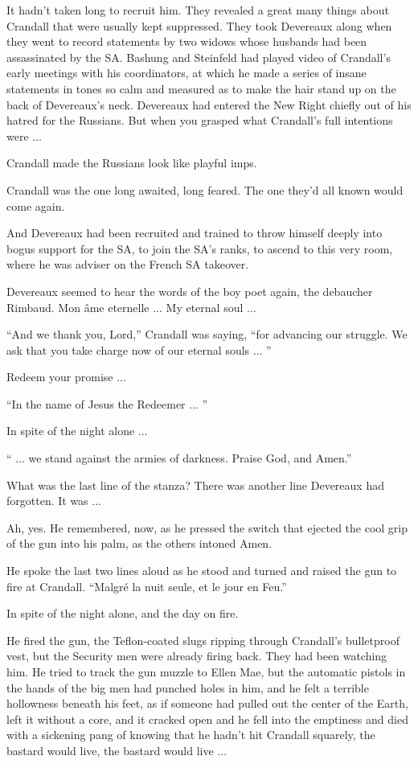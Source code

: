 It hadn't taken long to recruit him. They revealed a great many things about Crandall that were usually kept suppressed. They took Devereaux along when they went to record statements by two widows whose husbands had been assassinated by the SA. Bashung and Steinfeld had played video of Crandall's early meetings with his coordinators, at which he made a series of insane statements in tones so calm and measured as to make the hair stand up on the back of Devereaux's neck. Devereaux had entered the New Right chiefly out of his hatred for the Russians. But when you grasped what Crandall's full intentions were ...

Crandall made the Russians look like playful imps.

Crandall was the one long awaited, long feared. The one they'd all known would come again.

And Devereaux had been recruited and trained to throw himself deeply into bogus support for the SA, to join the SA's ranks, to ascend to this very room, where he was adviser on the French SA takeover.

Devereaux seemed to hear the words of the boy poet again, the debaucher Rimbaud. Mon âme eternelle ... My eternal soul ...

``And we thank you, Lord,'' Crandall was saying, ``for advancing our struggle. We ask that you take charge now of our eternal souls ... ''

Redeem your promise ...

``In the name of Jesus the Redeemer ... ''

In spite of the night alone ...

`` ... we stand against the armies of darkness. Praise God, and Amen.''

What was the last line of the stanza? There was another line Devereaux had forgotten. It was ...

Ah, yes. He remembered, now, as he pressed the switch that ejected the cool grip of the gun into his palm, as the others intoned Amen.

He spoke the last two lines aloud as he stood and turned and raised the gun to fire at Crandall. ``Malgré la nuit seule, et le jour en Feu.''

In spite of the night alone, and the day on fire.

He fired the gun, the Teflon-coated slugs ripping through Crandall's bulletproof vest, but the Security men were already firing back. They had been watching him. He tried to track the gun muzzle to Ellen Mae, but the automatic pistols in the hands of the big men had punched holes in him, and he felt a terrible hollowness beneath his feet, as if someone had pulled out the center of the Earth, left it without a core, and it cracked open and he fell into the emptiness and died with a sickening pang of knowing that he hadn't hit Crandall squarely, the bastard would live, the bastard would live ...

